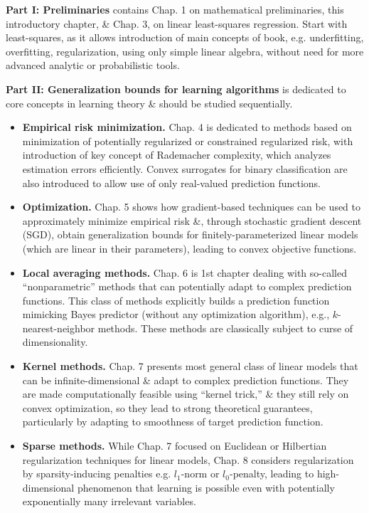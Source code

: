 \documentclass{article}
\begin{document}
\begin{enumerate}
\begin{itemize}
\begin{itemize}
			{\bf Part I: Preliminaries} contains Chap. 1 on mathematical preliminaries, this introductory chapter, \& Chap. 3, on linear least-squares regression. Start with least-squares, as it allows introduction of main concepts of book, e.g. underfitting, overfitting, regularization, using only simple linear algebra, without need for more advanced analytic or probabilistic tools.
			
			{\bf Part II: Generalization bounds for learning algorithms} is dedicated to core concepts in learning theory \& should be studied sequentially.
			\begin{itemize}
				\item {\bf Empirical risk minimization.} Chap. 4 is dedicated to methods based on minimization of potentially regularized or constrained regularized risk, with introduction of key concept of Rademacher complexity, which analyzes estimation errors efficiently. Convex surrogates for binary classification are also introduced to allow use of only real-valued prediction functions.
				\item {\bf Optimization.} Chap. 5 shows how gradient-based techniques can be used to approximately minimize empirical risk \&, through stochastic gradient descent (SGD), obtain generalization bounds for finitely-parameterized linear models (which are linear in their parameters), leading to convex objective functions.
				\item {\bf Local averaging methods.} Chap. 6 is 1st chapter dealing with so-called ``nonparametric'' methods that can potentially adapt to complex prediction functions. This class of methods explicitly builds a prediction function mimicking Bayes predictor (without any optimization algorithm), e.g., $k$-nearest-neighbor methods. These methods are classically subject to curse of dimensionality.
				\item {\bf Kernel methods.} Chap. 7 presents most general class of linear models that can be infinite-dimensional \& adapt to complex prediction functions. They are made computationally feasible using ``kernel trick,'' \& they still rely on convex optimization, so they lead to strong theoretical guarantees, particularly by adapting to smoothness of target prediction function.
				\item {\bf Sparse methods.} While Chap. 7 focused on Euclidean or Hilbertian regularization techniques for linear models, Chap. 8 considers regularization by sparsity-inducing penalties e.g. $l_1$-norm or $l_0$-penalty, leading to high-dimensional phenomenon that learning is possible even with potentially exponentially many irrelevant variables.

\end{itemize}
\end{itemize}
\end{itemize}
\end{enumerate}
\end{document}
